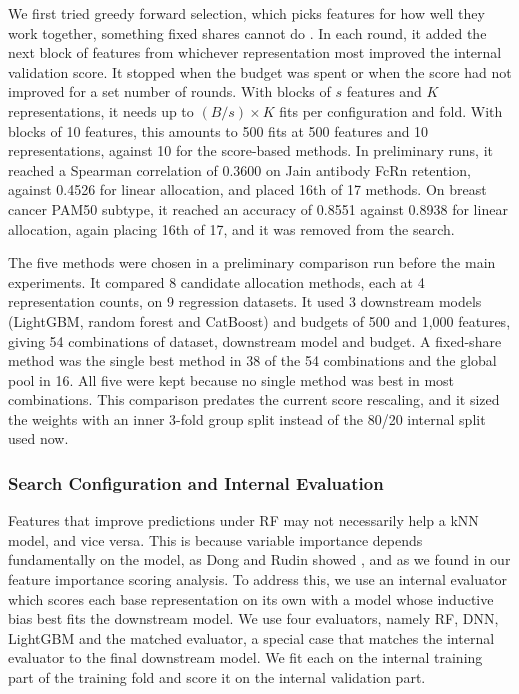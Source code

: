 We first tried greedy forward selection, which picks features for how well they work together, something fixed shares cannot do \citep{Kohavi1997, Guyon2003}. In each round, it added the next block of features from whichever representation most improved the internal validation score. It stopped when the budget was spent or when the score had not improved for a set number of rounds. With blocks of $s$ features and $K$ representations, it needs up to $(B/s) \times K$ fits per configuration and fold. With blocks of 10 features, this amounts to 500 fits at 500 features and 10 representations, against 10 for the score-based methods. In preliminary runs, it reached a Spearman correlation of 0.3600 on Jain antibody FcRn retention, against 0.4526 for linear allocation, and placed 16th of 17 methods. On breast cancer PAM50 subtype, it reached an accuracy of 0.8551 against 0.8938 for linear allocation, again placing 16th of 17, and it was removed from the search.

The five methods were chosen in a preliminary comparison run before the main experiments. It compared 8 candidate allocation methods, each at 4 representation counts, on 9 regression datasets. It used 3 downstream models (LightGBM, random forest and CatBoost) and budgets of 500 and 1,000 features, giving 54 combinations of dataset, downstream model and budget. A fixed-share method was the single best method in 38 of the 54 combinations and the global pool in 16. All five were kept because no single method was best in most combinations. This comparison predates the current score rescaling, and it sized the weights with an inner 3-fold group split instead of the 80/20 internal split used now.

\subsubsection{Search Configuration and Internal Evaluation}

Features that improve predictions under RF may not necessarily help a kNN model, and vice versa. This is because variable importance depends fundamentally on the model, as Dong and Rudin showed \citep{Dong2020}, and as we found in our feature importance scoring analysis. To address this, we use an internal evaluator which scores each base representation on its own with a model whose inductive bias best fits the downstream model. We use four evaluators, namely RF, DNN, LightGBM and the matched evaluator, a special case that matches the internal evaluator to the final downstream model. We fit each on the internal training part of the training fold and score it on the internal validation part.

